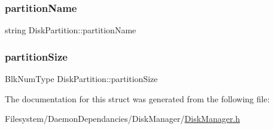 \mbox{\label{struct_disk_partition_a8c89b5f115fa534a3cb5d76505de97cb}} 
\subsubsection{\texorpdfstring{partition\+Name}{partitionName}}
{\footnotesize\ttfamily string Disk\+Partition\+::partition\+Name}

\mbox{\label{struct_disk_partition_a61dfe31b8baf361738168c2521c19286}} 
\subsubsection{\texorpdfstring{partition\+Size}{partitionSize}}
{\footnotesize\ttfamily Blk\+Num\+Type Disk\+Partition\+::partition\+Size}



The documentation for this struct was generated from the following file\+:\begin{DoxyCompactItemize}
\item 
Filesystem/\+Daemon\+Dependancies/\+Disk\+Manager/\mbox{\hyperlink{_disk_manager_8h}{Disk\+Manager.\+h}}\end{DoxyCompactItemize}
